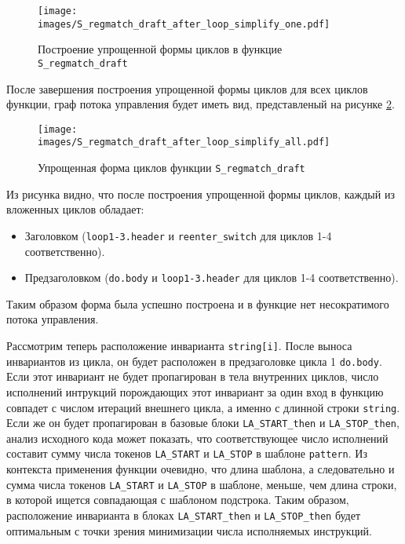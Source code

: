 \begin{figure}
    \centering
    \texttt{[image: images/S\_regmatch\_draft\_after\_loop\_simplify\_one.pdf]}
    \caption{Построение упрощенной формы циклов в функцие \texttt{S\_regmatch\_draft}}
    \label{fig:S_regmatch_darft_loop_simplify_one}
\end{figure}

После завершения построения упрощенной формы циклов для всех циклов функции, граф потока управления будет иметь вид, представленый на рисунке \ref{fig:S_regmatch_darft_loop_simplify_all}.

\begin{figure}
    \centering
    \texttt{[image: images/S\_regmatch\_draft\_after\_loop\_simplify\_all.pdf]}
    \caption{Упрощенная форма циклов функции \texttt{S\_regmatch\_draft}}
    \label{fig:S_regmatch_darft_loop_simplify_all}
\end{figure}

Из рисунка видно, что после построения упрощенной формы циклов, каждый из вложенных циклов обладает:
\begin{itemize}
    \item Заголовком (\texttt{loop1-3.header} и \texttt{reenter\_switch} для циклов 1-4 соответственно).
    \item Предзаголовком (\texttt{do.body} и \texttt{loop1-3.header} для циклов 1-4 соответственно).
\end{itemize}
Таким образом форма была успешно построена и в функцие нет несократимого потока управления.

Рассмотрим теперь расположение инварианта \texttt{string[i]}.
После выноса инвариантов из цикла, он будет расположен в предзаголовке цикла 1 \texttt{do.body}.
Если этот инвариант не будет пропагирован в тела внутренних циклов, число исполнений интрукций порождающих этот инвариант за один вход в функцию совпадет с числом итераций внешнего цикла, а именно с длинной строки \texttt{string}.
Если же он будет пропагирован в базовые блоки \texttt{LA\_START\_then} и \texttt{LA\_STOP\_then}, анализ исходного кода может показать, что соответствующее число исполнений составит сумму числа токенов \texttt{LA\_START} и \texttt{LA\_STOP} в шаблоне \texttt{pattern}.
Из контекста применения функции очевидно, что длина шаблона, а следовательно и сумма числа токенов \texttt{LA\_START} и \texttt{LA\_STOP} в шаблоне, меньше, чем длина строки, в которой ищется совпадающая с шаблоном подстрока.
Таким образом, расположение инварианта в блоках \texttt{LA\_START\_then} и \texttt{LA\_STOP\_then} будет оптимальным с точки зрения минимизации числа исполняемых инструкций.

